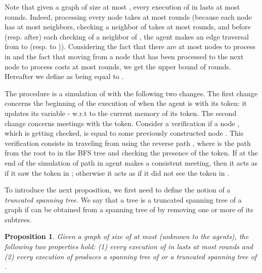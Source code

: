 \documentclass[11pt]{article}
\newtheorem{proposition}{Proposition}[section]
\begin{document}
{Note that given a graph  of size at most , every execution of  in  lasts at most  rounds. Indeed,  processing every node  takes at most  rounds (because each node  has at most  neighbors, checking a neighbor of  takes at most  rounds, and before (resp. after) each checking of a neighbor  of , the agent makes an edge traversal from  to  (resp.  to )). Considering the fact that there are at most  nodes to process in  and the fact that moving from a node that has been processed to the next node to process costs at most  rounds, we get the upper bound of  rounds. Hereafter we define  as being equal to .}

{The procedure  is a simulation of  with the following two changes. The first change concerns the beginning of the execution of  when the agent is with its token: it updates its variable - w.r.t to the current memory of its token. The second change concerns meetings with the token. Consider a verification if a node  , which is getting checked, is equal to some previously constructed node . This verification consists in traveling from  using the reverse path ,  where  is the path from the root  to  in the BFS tree and checking the presence of the token. If 
 at the end of the simulation of path  in  agent  makes a consistent meeting, then it acts as if it saw the token in ; otherwise it acts as if it did not see
 the token in .}

{To introduce the next proposition, we first need to define the notion of a {\em truncated spanning tree}. We say that a tree  is a truncated spanning tree of a graph  if  can be obtained from a spanning tree of  by removing one or more of its subtrees.}

{
\begin{proposition}
\label{prop1}
Given a graph  of size {of at most } (unknown to the agents), the following two properties hold: (1) every execution of  in  lasts at most  rounds and (2) every execution of  produces a spanning tree of  or a truncated spanning tree of .
\end{proposition}}
\end{document}
